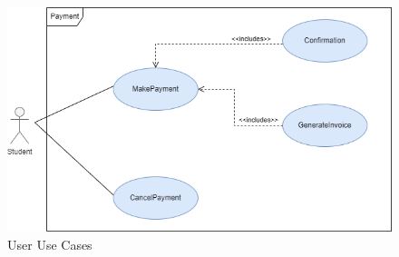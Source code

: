 \documentclass[hidelinks, 12pt, a4paper]{article}
\begin{document}
\begin{figure}[H]

      \centering
      \includegraphics[width=15cm]{images/Payment UseCase.drawio.png}
      \caption{User Use Cases}
      \label{fig:User UseCases}

\end{figure}
\end{document}
